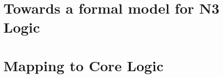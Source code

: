 \documentclass[11pt,a4paper,twoside]{book}
\newcommand\blankpage{%
    \null
    \thispagestyle{empty}%
    \addtocounter{page}{-1}%
    \newpage}
\begin{document}
    
    

    \printglossary[title=List of Abbreviations and Glossary] %

	


\mainmatter

\label{intro}





\chapter{Towards a formal model for N3 Logic}\label{problem}\label{semantics}

% 


\label{ela}



\chapter{Mapping to Core Logic}






\label{exsem}




%

\end{document}
